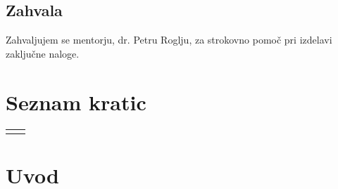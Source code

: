 \documentclass[12pt,a4paper,titlepage,openany]{report}
\begin{document}

\newpage
\section*{Zahvala}

Zahvaljujem se mentorju, dr. Petru Roglju, za strokovno pomoč pri izdelavi zaključne naloge.

\newpage

\tableofcontents
{}
\newpage
\listoftables
{}
\newpage
\listoffigures
{}
\newpage
\renewcommand{\cftdot}{}
\listofappendices
\thispagestyle{fancy}
\newpage

\chapter*{Seznam kratic}
\thispagestyle{fancyplain}
\begin{longtable}{@{}p{1cm}@{}p{\dimexpr\textwidth-1cm\relax}@{}}
\nomenclature{$kWh$}{kilovat ura}
\nomenclature{$RMS$}{root mean square}
\nomenclature{$RMS$}{root mean square}
\end{longtable}
\newpage

\normalsize


% 
% 

\chapter{Uvod}
\thispagestyle{fancy}
\end{document}
